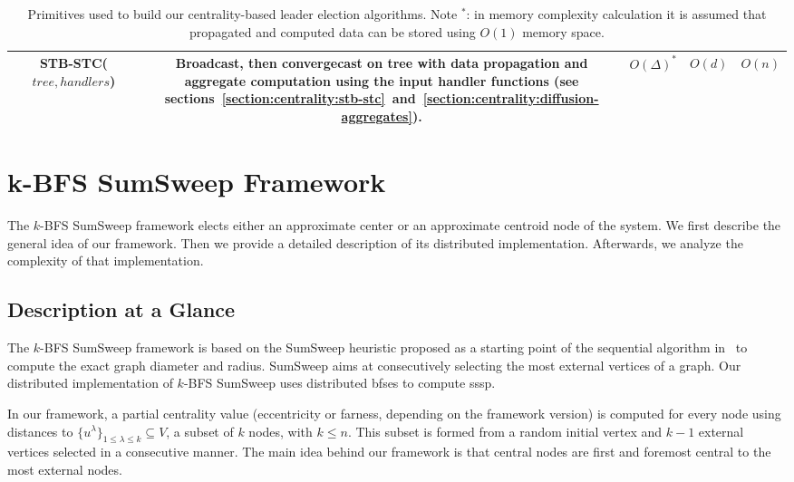 {\begin{center}
\begin{table}[!h]
{\begin{tabular}{|C{\lenOneOne}|C{\lenTwoTwo}|C{\lenZeroZero}|C{\lenZeroZero}|C{\lenZeroZero}|}
					\hline
					STB-STC($tree,handlers$) & Broadcast, then convergecast on tree with data propagation and aggregate computation using the input handler functions (see sections~\ref{section:centrality:stb-stc}~and~\ref{section:centrality:diffusion-aggregates}). & $O(\Delta)^*$ & $O(d)$ & $O(n)$\\
					\hline
				\end{tabular}
			}
			\caption{Primitives used to build our centrality-based leader election algorithms. Note $^*$: in memory complexity calculation it is assumed that propagated and computed data can be stored using $O(1)$ memory space.}\label{table:centrality:distributed-primitives}
		\end{table}
	\end{center}
}

\section{k-BFS SumSweep Framework}
\label{section:centrality:k-bfs}

The $k$-BFS SumSweep framework elects either an approximate center or an approximate centroid node of the system. We first describe the general idea of our framework. Then we provide a detailed description of its distributed implementation. Afterwards, we analyze the complexity of that implementation.

\subsection{Description at a Glance}

The $k$-BFS SumSweep framework is based on the SumSweep heuristic proposed as a starting point of the sequential algorithm in~\cite{borassi2014solvability} to compute the exact graph diameter and radius. SumSweep aims at consecutively selecting the most external vertices of a graph. Our distributed implementation of $k$-BFS SumSweep uses distributed \gls{bfses} to compute \gls{sssp}.

In our framework, a partial centrality value (eccentricity or farness, depending on the framework version) is computed for every node using distances to $\{u^\lambda\}_{1\leq \lambda \leq k} \subseteq V$, a subset of $k$ nodes, with $k \leq n$. This subset is formed from a random initial vertex and $k-1$ external vertices selected in a consecutive manner. The main idea behind our framework is that central nodes are first and foremost central to the most external nodes.

